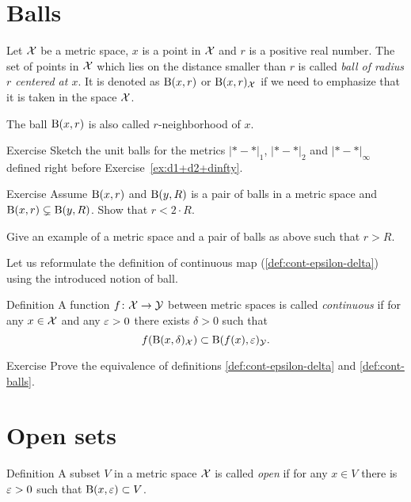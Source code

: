 \section{Balls}

Let $\mathcal{X}$ be a metric space, 
$x$ is a point in $\mathcal{X}$ 
and $r$ is a positive real number.
The set of points in $\mathcal{X}$ which lies on the distance smaller than $r$ is called \emph{ball of radius $r$ centered at $x$}.
It is denoted as $\mathrm{B}(x,r)$ 
or $\mathrm{B}(x,r)_{\mathcal{X}}$ if we need to emphasize that it is taken in the space $\mathcal{X}$.

The ball $\mathrm{B}(x,r)$ is also called $r$-neighborhood of $x$.

\begin{thm}{Exercise}\label{ex:d1+d2+dinfty-open}
Sketch the unit balls for the metrics $|{*}-{*}|_1$, $|{*}-{*}|_2$ and $|{*}-{*}|_\infty$ defined right before Exercise~\ref{ex:d1+d2+dinfty}.
\end{thm}

\begin{thm}{Exercise}
Assume $\mathrm{B}(x,r)$  and $\mathrm{B}(y,R)$ is a pair of balls in a metric space 
and $\mathrm{B}(x,r)\subsetneq \mathrm{B}(y,R)$.
Show that $r<2\cdot R$.

Give an example of a metric space and a pair of balls as above such that $r> R$.
\end{thm}

Let us reformulate the definition of continuous map (\ref{def:cont-epsilon-delta}) using the introduced notion of ball.

\begin{thm}{Definition}\label{def:cont-balls}
A function $f\colon\mathcal{X}\to\mathcal{Y}$ between metric spaces is called \emph{continuous} if for any $x\in \mathcal{X}$ and any $\varepsilon>0$ there exists $\delta>0$ such that 
\[f(\mathrm{B}(x,\delta)_{\mathcal{X}})\subset\mathrm{B}(f(x),\varepsilon)_{\mathcal{Y}}.\]

\end{thm}

\begin{thm}{Exercise}
Prove the equivalence of definitions \ref{def:cont-epsilon-delta} and \ref{def:cont-balls}.
\end{thm}



\section{Open sets}

\begin{thm}{Definition}\label{def:open}
A subset $V$ in a metric space $\mathcal{X}$ is called \emph{open} if for any $x\in V$ there is $\varepsilon>0$ such that $\mathrm{B}(x,\varepsilon)\subset V$.
\end{thm}

